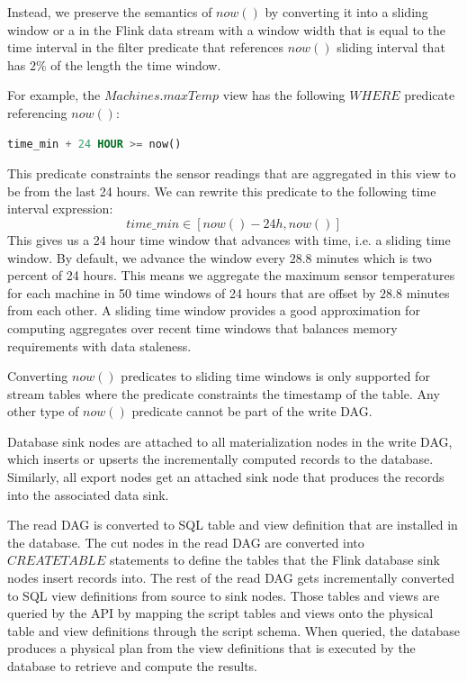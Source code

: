 \documentclass[	DIV=calc,%
							paper=letter,%
							fontsize=11pt,%
							twocolumn]{scrartcl}	 					%
\begin{document}
Instead, we preserve the semantics of $now()$ by converting it into a sliding window or a in the Flink data stream with a window width that is equal to the time interval in the filter predicate that references $now()$ sliding interval that has $2\%$ of the length the time window.

For example, the $Machines.maxTemp$ view has the following $WHERE$ predicate referencing $now()$:
\begin{lstlisting}[language=SQL]
time_min + 24 HOUR >= now()
\end{lstlisting}
This predicate constraints the sensor readings that are aggregated in this view to be from the last 24 hours. We can rewrite this predicate to the following time interval expression:
\begin{equation}
time\_min \in [now() - 24h, now()]
\end{equation}
This gives us a 24 hour time window that advances with time, i.e. a sliding time window. By default, we advance the window every $28.8$ minutes which is two percent of 24 hours. This means we aggregate the maximum sensor temperatures for each machine in 50 time windows of 24 hours that are offset by $28.8$ minutes from each other. A sliding time window provides a good approximation for computing aggregates over recent time windows that balances memory requirements with data staleness.



Converting $now()$ predicates to sliding time windows is only supported for stream tables where the predicate constraints the timestamp of the table. Any other type of $now()$ predicate cannot be part of the write DAG.

Database sink nodes are attached to all materialization nodes in the write DAG, which inserts or upserts the incrementally computed records to the database. Similarly, all export nodes get an attached sink node that produces the records into the associated data sink.

The read DAG is converted to SQL table and view definition that are installed in the database. The cut nodes in the read DAG are converted into $CREATE TABLE$ statements to define the tables that the Flink database sink nodes insert records into. The rest of the read DAG gets incrementally converted to SQL view definitions from source to sink nodes. Those tables and views are queried by the API by mapping the script tables and views onto the physical table and view definitions through the script schema. When queried, the database produces a physical plan from the view definitions that is executed by the database to retrieve and compute the results.
\end{document}
